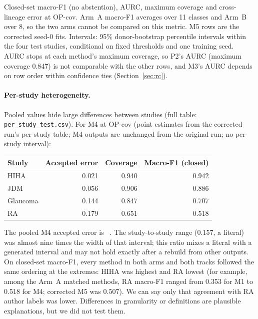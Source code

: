 \documentclass[11pt]{article}
\newcommand{\gentable}[1]{\begin{adjustbox}{max width=\textwidth,max totalheight=0.82\textheight}\end{adjustbox}}
\begin{document}
\begin{table}[t]
\centering
\caption{Closed-set macro-F1 (no abstention), AURC, maximum coverage and cross-lineage error at OP-cov. Arm~A macro-F1 averages over 11 classes and Arm~B over 8, so the two arms cannot be compared on this metric. M5 rows are the corrected seed-0 fits. Intervals: 95\% donor-bootstrap percentile intervals within the four test studies, conditional on fixed thresholds and one training seed. AURC stops at each method's maximum coverage, so P2's AURC (maximum coverage 0.847) is not comparable with the other rows, and M3's AURC depends on row order within confidence ties (Section~\ref{sec:rc}).}
\label{tab:closed}
\gentable{table_closed_set.tex}
\end{table}

\paragraph{Per-study heterogeneity.} Pooled values hide large differences between studies (full table: \nolinkurl{per_study_test.csv}). For M4 at OP-cov (point estimates from the corrected run's per-study table; M4 outputs are unchanged from the original run; no per-study interval):

\begin{center}
\small
\begin{tabular}{lrrr}
\toprule
Study & Accepted error & Coverage & Macro-F1 (closed) \\
\midrule
HIHA & 0.021 & 0.940 & 0.942 \\
JDM & 0.056 & 0.906 & 0.886 \\
Glaucoma & 0.144 & 0.847 & 0.707 \\
RA & 0.179 & 0.651 & 0.518 \\
\bottomrule
\end{tabular}
\end{center}

\noindent The pooled M4 accepted error is ~. The study-to-study range (0.157, a literal) was almost nine times the width of that interval; this ratio mixes a literal with a generated interval and may not hold exactly after a rebuild from other outputs. On closed-set macro-F1, every method in both arms and both tracks followed the same ordering at the extremes: HIHA was highest and RA lowest (for example, among the Arm~A matched methods, RA macro-F1 ranged from 0.353 for M1 to 0.518 for M4; corrected M5 was 0.507). We can say only that agreement with RA author labels was lower. Differences in granularity or definitions are plausible explanations, but we did not test them.
\end{document}
